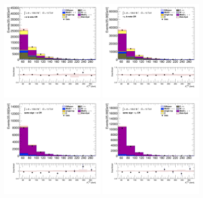 		\begin{figure}[!thp]
			\begin{center}    
			\includegraphics[width=0.45\textwidth]{chapters/chapter6_HPlus/images/taulep/met_et_TAUEL_BVETO.png} 
			\includegraphics[width=0.45\textwidth]{chapters/chapter6_HPlus/images/taulep/met_et_TAUMU_BVETO.png} \\
			\includegraphics[width=0.45\textwidth]{chapters/chapter6_HPlus/images/taulep/met_et_SS_TAUEL.png} 
			\includegraphics[width=0.45\textwidth]{chapters/chapter6_HPlus/images/taulep/met_et_SS_TAUMU.png} \\

\end{center}
\end{figure}
